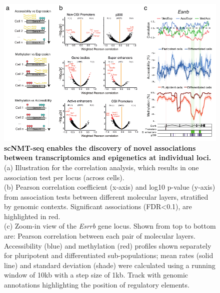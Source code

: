 \begin{figure}[H]
	\centering
	\includegraphics[width=1.0\linewidth]{scNMT_EB_correlations}
	\caption[]{
	\textbf{scNMT-seq enables the discovery of novel associations between transcriptomics and epigenetics at individual loci.}\\ 
	(a) Illustration for the correlation analysis, which results in one association test per locus (across cells). \\
	(b) Pearson correlation coefficient (x-axis) and log10 p-value (y-axis) from association tests between different molecular layers, stratified by genomic contexts. Significant associations (FDR<0.1), are highlighted in red.\\
	(c) Zoom-in view of the \textit{Esrrb} gene locus. Shown from top to bottom are: Pearson correlation between each pair of molecular layers. Accessibility (blue) and methylation (red) profiles shown separately for pluripotent and differentiated sub-populations; mean rates (solid line) and standard deviation (shade) were calculated using a running window of 10kb with a step size of 1kb. Track with genomic annotations highlighting the position of regulatory elements.
	}
	\label{fig:scnmt_eb_correlations}
\end{figure}



